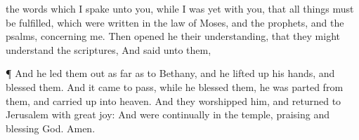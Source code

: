 {{{{}
the words
which
I spake
unto
you,
while I was
yet
with
you,
that
all things
must be
fulfilled,
which
were written
in
the law
of Moses,
and
{}
the prophets,
and
{}
the psalms,
concerning
me.}}
Then opened
he
their
understanding,
that they might
understand the
scriptures,
And
said unto
them,
{}
\par }{\PP {}
\par }{\PP {}¶
And he
led
them
out as far
as
to
Bethany,
and he lifted
up
his
hands, and
blessed
them.
And it came to
pass,
while
he
blessed
them, he was
parted
from
them,
and carried
up
into
heaven.
And
they
worshipped
him, and
returned
to
Jerusalem
with
great
joy:
And
were
continually
in the
temple,
praising
and
blessing
God.
Amen.
\par }